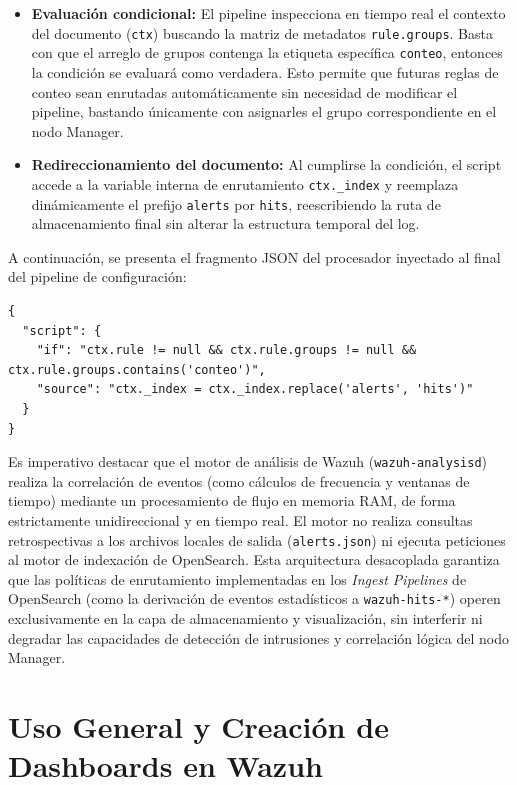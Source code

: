 \begin{itemize}
\item \textbf{Evaluación condicional:} El pipeline inspecciona en tiempo real el contexto del documento (\texttt{ctx}) buscando la matriz de metadatos \texttt{rule.groups}. Basta con que el arreglo de grupos contenga la etiqueta específica \texttt{conteo}, entonces la condición se evaluará como verdadera. Esto permite que futuras reglas de conteo sean enrutadas automáticamente sin necesidad de modificar el pipeline, bastando únicamente con asignarles el grupo correspondiente en el nodo Manager.
\item \textbf{Redireccionamiento del documento:} Al cumplirse la condición, el script accede a la variable interna de enrutamiento \verb|ctx._index| y reemplaza dinámicamente el prefijo \texttt{alerts} por \texttt{hits}, reescribiendo la ruta de almacenamiento final sin alterar la estructura temporal del log.
\end{itemize}

A continuación, se presenta el fragmento JSON del procesador inyectado al final del pipeline de configuración:

\begin{lstlisting}[style=logstyle,
    caption={Fragmento de código JSON del procesador condicional agregado al pipeline de ingesta.}
]
{
  "script": {
    "if": "ctx.rule != null && ctx.rule.groups != null && ctx.rule.groups.contains('conteo')",
    "source": "ctx._index = ctx._index.replace('alerts', 'hits')"
  }
}
\end{lstlisting}

Es imperativo destacar que el motor de análisis de Wazuh (\texttt{wazuh-analysisd}) realiza la correlación de eventos (como cálculos de frecuencia y ventanas de tiempo) mediante un procesamiento de flujo en memoria RAM, de forma estrictamente unidireccional y en tiempo real. El motor no realiza consultas retrospectivas a los archivos locales de salida (\texttt{alerts.json}) ni ejecuta peticiones al motor de indexación de OpenSearch. Esta arquitectura desacoplada garantiza que las políticas de enrutamiento implementadas en los \textit{Ingest Pipelines} de OpenSearch (como la derivación de eventos estadísticos a \texttt{wazuh-hits-*}) operen exclusivamente en la capa de almacenamiento y visualización, sin interferir ni degradar las capacidades de detección de intrusiones y correlación lógica del nodo Manager.

\section{Uso General y Creación de Dashboards en Wazuh}

